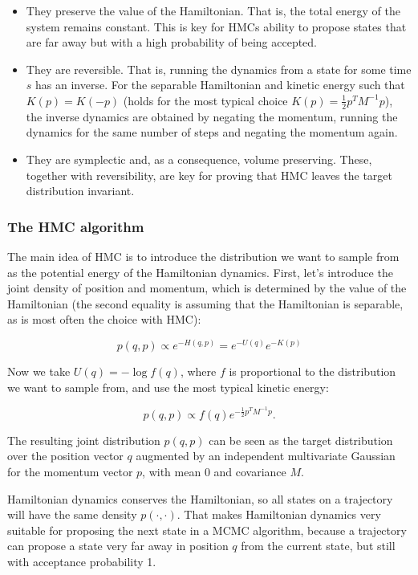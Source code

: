 \documentclass{book}
\theoremstyle{plain}%
\theoremstyle{definition}
\begin{document}
\begin{itemize}
\item They preserve the value of the Hamiltonian. That is, the total energy of the system remains constant. This is key for HMCs ability to propose states that are far away but with a high probability of being accepted.
\item They are reversible. That is, running the dynamics from a state for some time $s$ has an inverse. For the separable Hamiltonian and kinetic energy such that $K(p) = K(-p)$ (holds for the most typical choice $K(p) = \frac{1}{2}p^T M^{-1} p$), the inverse dynamics are obtained by negating the momentum, running the dynamics for the same number of steps and negating the momentum again.
\item They are symplectic and, as a consequence, volume preserving. These, together with reversibility, are key for proving that HMC leaves the target distribution invariant.
\end{itemize}

\subsubsection*{The HMC algorithm}

The main idea of HMC is to introduce the distribution we want to sample from as the potential energy of the Hamiltonian dynamics. First, let's introduce the joint density of position and momentum, which is determined by the value of the Hamiltonian (the second equality is assuming that the Hamiltonian is separable, as is most often the choice with HMC):

$$p(q, p) \propto e^{-H(q, p)} = e^{-U(q)} e^{-K(p)}$$

Now we take $U(q) = -\log f(q)$, where $f$ is proportional to the distribution we want to sample from, and use the most typical kinetic energy:

$$p(q, p) \propto f(q) e^{-\frac{1}{2}p^TM^{-1}p}.$$

The resulting joint distribution $p(q, p)$ can be seen as the target distribution over the position vector $q$ augmented by an independent multivariate Gaussian for the momentum vector $p$, with mean 0 and covariance $M$.

Hamiltonian dynamics conserves the Hamiltonian, so all states on a trajectory will have the same density $p(\cdot, \cdot)$. That makes Hamiltonian dynamics very suitable for proposing the next state in a MCMC algorithm, because a trajectory can propose a state very far away in position $q$ from the current state, but still with acceptance probability 1.
\end{document}
